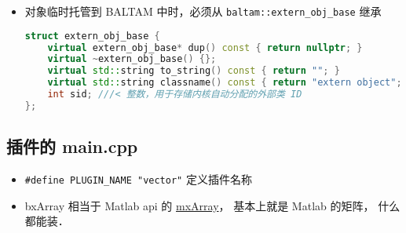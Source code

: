 
\begin{issues}
\issueDraft
\end{issues}

\begin{itemize}
\item 对象临时托管到 BALTAM 中时，必须从 \verb|baltam::extern_obj_base| 继承
\begin{lstlisting}[language=cpp, caption=extern\_obj.h节选]
struct extern_obj_base {
    virtual extern_obj_base* dup() const { return nullptr; }
    virtual ~extern_obj_base() {};
    virtual std::string to_string() const { return ""; }
    virtual std::string classname() const { return "extern object"; };
    int sid; ///< 整数，用于存储内核自动分配的外部类 ID
};
\end{lstlisting}
\end{itemize}

\subsection{插件的 main.cpp}
\begin{itemize}
\item \verb|#define PLUGIN_NAME "vector"| 定义插件名称
\item bxArray 相当于 Matlab api 的 \href{https://www.mathworks.com/help/matlab/apiref/mxarray.html}{mxArray}， 基本上就是 Matlab 的矩阵， 什么都能装．
\end{itemize}

